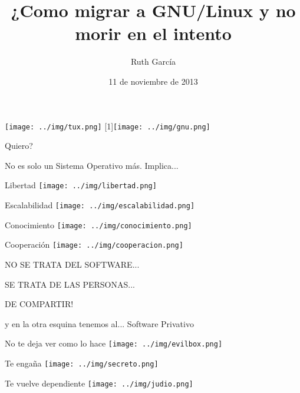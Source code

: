 \documentclass[xcolor=dvipsnames, pdf]{beamer}
\title[Migrando a GNU/Linux]{¿Como migrar a GNU/Linux y no morir en el intento}
\author[VengadoraVG]{Ruth Garc\'ia}
\date[Noviemebre, 2013]{11 de noviembre de 2013}
\begin{document}
\begin{section}
  {}  
  \begin{frame}[clean]
    \titlepage
    \texttt{[image: ../img/tux.png]}\hfill 
    \scalebox{-1}[1]{\texttt{[image: ../img/gnu.png]}}
  \end{frame}
\end{section}

\begin{section}
  {Quiero?}
  
  \begin{subsection}
    {No es solo un Sistema Operativo m\'{a}s. Implica...}
    \begin{frame}
      {Libertad}
      \texttt{[image: ../img/libertad.png]}
    \end{frame}
    
    \begin{frame}
      {Escalabilidad}
      \texttt{[image: ../img/escalabilidad.png]}
    \end{frame}
    
    \begin{frame}
      {Conocimiento}
      \texttt{[image: ../img/conocimiento.png]}
    \end{frame}
    
    \begin{frame}
      {Cooperaci\'on}
      \texttt{[image: ../img/cooperacion.png]}
    \end{frame}
  \end{subsection}
  
  \begin{frame}
    \vfill
    NO SE TRATA DEL SOFTWARE...  
    \begin{center} SE TRATA DE LAS PERSONAS... \end{center}
    \hfill DE COMPARTIR!
    \vfill
  \end{frame}
  
  \begin{subsection}
    {y en la otra esquina tenemos al... Software Privativo}
    
    \begin{frame}
      {No te deja ver como lo hace}
      \texttt{[image: ../img/evilbox.png]}
    \end{frame}

    \begin{frame}
      {Te enga\~{n}a}
      \texttt{[image: ../img/secreto.png]}
    \end{frame}

    \begin{frame}
      {Te vuelve dependiente}
      \texttt{[image: ../img/judio.png]}
    \end{frame}
  \end{subsection}
\end{section}
\end{document}
